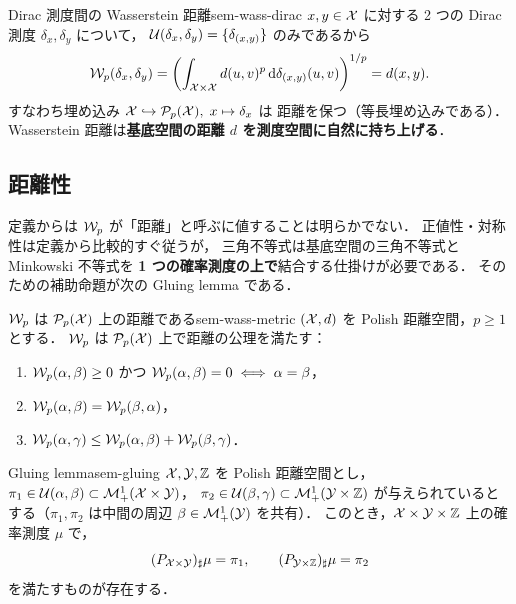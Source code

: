 \begin{example}{Dirac 測度間の Wasserstein 距離}{sem-wass-dirac}
  $x, y \in \mathcal{X}$ に対する 2 つの Dirac 測度 $\delta_x, \delta_y$ について，
  $\mathcal{U}(\delta_x, \delta_y) = \{\delta_{(x, y)}\}$ のみであるから
  \[
    \mathcal{W}_p(\delta_x, \delta_y)
    = \left( \int_{\mathcal{X} \times \mathcal{X}} d(u, v)^p \, \mathrm{d}\delta_{(x, y)}(u, v) \right)^{1/p}
    = d(x, y).
  \]
  すなわち埋め込み $\mathcal{X} \hookrightarrow \mathcal{P}_p(\mathcal{X}),\; x \mapsto \delta_x$ は
  距離を保つ（等長埋め込みである）．
  Wasserstein 距離は\textbf{基底空間の距離 $d$ を測度空間に自然に持ち上げる}．
\end{example}

\subsection{距離性}

定義からは $\mathcal{W}_p$ が「距離」と呼ぶに値することは明らかでない．
正値性・対称性は定義から比較的すぐ従うが，
三角不等式は基底空間の三角不等式と Minkowski 不等式を
\textbf{1 つの確率測度の上で}結合する仕掛けが必要である．
そのための補助命題が次の Gluing lemma である．

\begin{theorem}{$\mathcal{W}_p$ は $\mathcal{P}_p(\mathcal{X})$ 上の距離である}{sem-wass-metric}
  $(\mathcal{X}, d)$ を Polish 距離空間，$p \geq 1$ とする．
  $\mathcal{W}_p$ は $\mathcal{P}_p(\mathcal{X})$ 上で距離の公理を満たす：
  \begin{enumerate}
    \item[\textup{(i)}]
      $\mathcal{W}_p(\alpha, \beta) \geq 0$ かつ
      $\mathcal{W}_p(\alpha, \beta) = 0 \iff \alpha = \beta$，
    \item[\textup{(ii)}]
      $\mathcal{W}_p(\alpha, \beta) = \mathcal{W}_p(\beta, \alpha)$，
    \item[\textup{(iii)}]
      $\mathcal{W}_p(\alpha, \gamma) \leq \mathcal{W}_p(\alpha, \beta) + \mathcal{W}_p(\beta, \gamma)$．
  \end{enumerate}
\end{theorem}

\begin{proposition}{Gluing lemma}{sem-gluing}
  $\mathcal{X}, \mathcal{Y}, \mathbb{Z}$ を Polish 距離空間とし，
  $\pi_1 \in \mathcal{U}(\alpha, \beta) \subset \mathcal{M}_+^1(\mathcal{X} \times \mathcal{Y})$，
  $\pi_2 \in \mathcal{U}(\beta, \gamma) \subset \mathcal{M}_+^1(\mathcal{Y} \times \mathbb{Z})$
  が与えられているとする（$\pi_1, \pi_2$ は中間の周辺 $\beta \in \mathcal{M}_+^1(\mathcal{Y})$ を共有）．
  このとき，$\mathcal{X} \times \mathcal{Y} \times \mathbb{Z}$ 上の確率測度 $\mu$ で，
  \[
    (P_{\mathcal{X} \times \mathcal{Y}})_\sharp \mu = \pi_1,
    \qquad
    (P_{\mathcal{Y} \times \mathbb{Z}})_\sharp \mu = \pi_2
  \]
  を満たすものが存在する．
\end{proposition}

